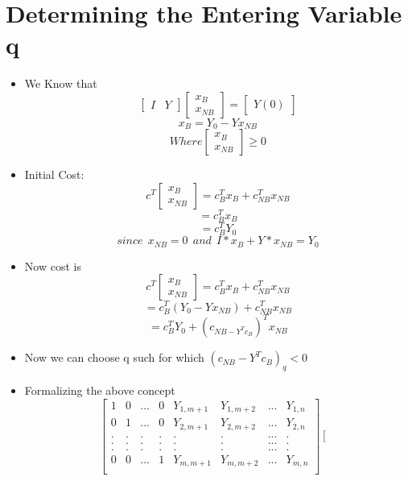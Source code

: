 \documentclass[twoside]{article}
\begin{document}
\section{Determining the Entering Variable q}
\begin{itemize}
\item We Know that
\[ \left[ \begin{array}{cc}
I &
Y  \end{array} \right] \left[ \begin{array}{cc}
x_B \\
x_{NB}  \end{array} \right]= \left[ \begin{array}{c}

Y(0)  \end{array} \right] \]
\[ x_B=Y_0-Yx_{NB} \]
\[Where \left[ \begin{array}{cc}
x_B \\
x_{NB}  \end{array} \right] \ge 0 \]
\item Initial Cost:
\[c^T\left[ \begin{array}{cc}
x_B \\
x_{NB}  \end{array} \right] =c_B^Tx_B+c_{NB}^Tx_{NB} \]
\[=c_B^Tx_B\]
\[=c_B^T Y_0\]
\[since~~x_{NB}=0 ~~and~~ I \ast x_B + Y \ast x_{NB}= Y_0\]
\item Now cost is
\[c^T\left[ \begin{array}{cc}
x_B \\
x_{NB}  \end{array} \right] =c_B^Tx_B+c_{NB}^Tx_{NB} \]
\[=c_B^T(Y_0-Yx_{NB})+c_{NB}^Tx_{NB}\]
\[ =c_B^TY_0+(c_{NB-Y^Tc_B})^Tx_{NB} \]
\item Now we can choose q such for which	$(c_{NB}-Y^Tc_B)_q<0$
\item Formalizing the above concept
\[ \left[ \begin{array}{cccccccc}
1 & 0 & ... & 0 & Y_{1,m+1} &Y_{1,m+2} & ... & Y_{1,n} \\
0 & 1 & ... & 0 & Y_{2,m+1} &Y_{2,m+2} & ... & Y_{2,n} \\
. & . & . & . & . & . & ... & . \\
. & . & . & . & . & . & ... & . \\
. & . & . & . & . & . & ... & . \\
0 & 0 & ... & 1 & Y_{m,m+1} &Y_{m,m+2} & ... & Y_{m,n} \\
  \end{array} \right] \left[ \begin{array}{c}

\end{array}\]
\end{itemize}
\end{document}
